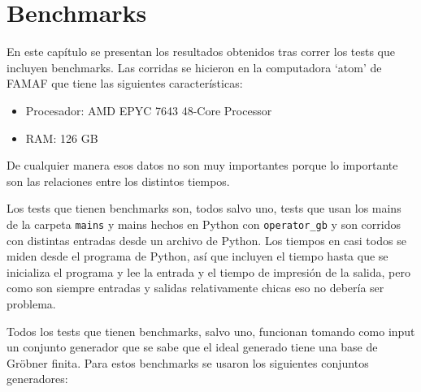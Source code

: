 \documentclass[12pt]{report}
\theoremstyle{customstyle}
\theoremstyle{factstyle}
\begin{document}
\chapter{Benchmarks}\label{cap:Benchmarks}

En este capítulo se presentan los resultados obtenidos tras correr los tests que incluyen benchmarks. Las corridas se hicieron en la computadora `atom' de FAMAF que tiene las siguientes características:

\begin{itemize}
  \item Procesador: AMD EPYC 7643 48-Core Processor
  \item RAM: 126 GB
\end{itemize}

De cualquier manera esos datos no son muy importantes porque lo importante son las relaciones entre los distintos tiempos.

Los tests que tienen benchmarks son, todos salvo uno, tests que usan los mains de la carpeta \texttt{mains} y mains hechos en Python con \texttt{operator\_gb} y son corridos con distintas entradas desde un archivo de Python. Los tiempos en casi todos se miden desde el programa de Python, así que incluyen el tiempo hasta que se inicializa el programa y lee la entrada y el tiempo de impresión de la salida, pero como son siempre entradas y salidas relativamente chicas eso no debería ser problema.

Todos los tests que tienen benchmarks, salvo uno, funcionan tomando como input un conjunto generador que se sabe que el ideal generado tiene una base de Gröbner finita. Para estos benchmarks se usaron los siguientes conjuntos generadores:
\end{document}
